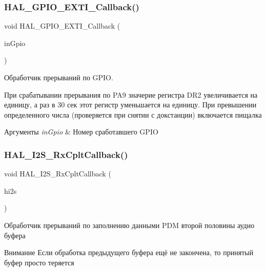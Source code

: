 \subsubsection{\texorpdfstring{H\+A\+L\+\_\+\+G\+P\+I\+O\+\_\+\+E\+X\+T\+I\+\_\+\+Callback()}{HAL\_GPIO\_EXTI\_Callback()}}
{\footnotesize\ttfamily void H\+A\+L\+\_\+\+G\+P\+I\+O\+\_\+\+E\+X\+T\+I\+\_\+\+Callback (\begin{DoxyParamCaption}\item[{uint16\+\_\+t}]{in\+Gpio }\end{DoxyParamCaption})}



Обработчик прерываний по G\+P\+IO. 





При срабатывании прерывания по P\+A9 значерие регистра D\+R2 увеличивается на единицу, а раз в 30 сек этот регистр уменьшается на единицу. При превышении определенного числа (проверяется при снятии с докстанции) включается пищалка 
\begin{DoxyParams}{Аргументы}
{\em in\+Gpio} & Номер сработавшего G\+P\+IO \\
\hline
\end{DoxyParams}
\mbox{\label{group___callback_ga18c33b2d429b06674ec30e5b2b81862c}} 
\subsubsection{\texorpdfstring{H\+A\+L\+\_\+\+I2\+S\+\_\+\+Rx\+Cplt\+Callback()}{HAL\_I2S\_RxCpltCallback()}}
{\footnotesize\ttfamily void H\+A\+L\+\_\+\+I2\+S\+\_\+\+Rx\+Cplt\+Callback (\begin{DoxyParamCaption}\item[{I2\+S\+\_\+\+Handle\+Type\+Def $\ast$}]{hi2s }\end{DoxyParamCaption})}



Обработчик прерываний по заполнению данными P\+DM второй половины аудио буфера 



 \begin{DoxyAttention}{Внимание}
Если обработка предыдущего буфера ещё не закончена, то принятый буфер просто теряется 
\end{DoxyAttention}
\mbox{\label{group___callback_ga6c4cd3b18c42c6de0c3f4fe7068a5b12}} 
